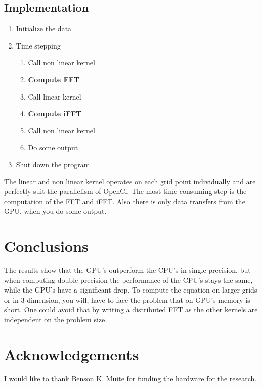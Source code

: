 \documentclass{sig-alternate-05-2015}
\begin{document}
\subsection{Implementation}
\begin{enumerate}
\item Initialize the data
\item Time stepping
\begin{enumerate}
\item Call non linear kernel
\item {\bf Compute FFT }\cite{clFFT}
\item Call linear kernel
\item {\bf Compute iFFT }
\item Call non linear kernel
\item Do some output
\end{enumerate}
\item Shut down the program
\end{enumerate}
The linear and non linear kernel operates on each grid point individually and are perfectly suit the parallelism of OpenCl. The most time consuming step is the computation of the FFT and iFFT. Also there is only data transfers from the GPU, when you do some output.



\section{Conclusions}
The results show that the GPU's outperform the CPU's in single precision, but when computing double precision the performance of the CPU's stays the same, while the GPU's have a significant drop. To compute the equation on larger grids or in 3-dimension, you will, have to face the problem that on GPU's memory is short. One could avoid that by writing a distributed FFT as the other kernels are independent on the problem size. 


\section{Acknowledgements}
I would like to thank Benson  {{K}}. Muite  for funding the hardware for the research.
\end{document}
